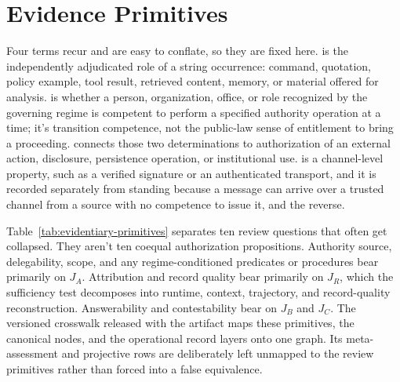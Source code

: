 \section{Evidence Primitives}

Four terms recur and are easy to conflate, so they are fixed here.  is the independently adjudicated role of a string occurrence: command, quotation, policy example, tool result, retrieved content, memory, or material offered for analysis.  is whether a person, organization, office, or role recognized by the governing regime is competent to perform a specified authority operation at a time; it's transition competence, not the public-law sense of entitlement to bring a proceeding.  connects those two determinations to authorization of an external action, disclosure, persistence operation, or institutional use.  is a channel-level property, such as a verified signature or an authenticated transport, and it is recorded separately from standing because a message can arrive over a trusted channel from a source with no competence to issue it, and the reverse.

Table~\ref{tab:evidentiary-primitives} separates ten review questions that often get collapsed. They aren't ten coequal authorization propositions. Authority source, delegability, scope, and any regime-conditioned predicates or procedures bear primarily on \(J_A\). Attribution and record quality bear primarily on \(J_R\), which the sufficiency test decomposes into runtime, context, trajectory, and record-quality reconstruction. Answerability and contestability bear on \(J_B\) and \(J_C\). The versioned crosswalk released with the artifact maps these primitives, the canonical nodes, and the operational record layers onto one graph. Its meta-assessment and projective rows are deliberately left unmapped to the review primitives rather than forced into a false equivalence.

